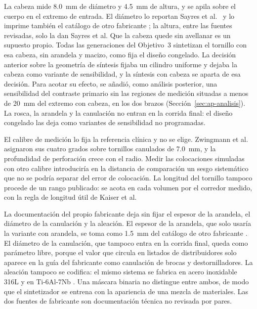 La cabeza mide 8.0~mm de diámetro y 4.5~mm de altura, y se apila sobre el cuerpo en el extremo de entrada. El diámetro lo reportan Sayres et al.~\cite{sayres2014comparison} y lo imprime también el catálogo de otro fabricante \cite{doublemedical2021trauma}; la altura, entre las fuentes revisadas, solo la dan Sayres et al. Que la cabeza quede sin avellanar es un supuesto propio. Todas las generaciones del Objetivo~3 sintetizan el tornillo con esa cabeza, sin arandela y macizo, como fija el diseño congelado. La decisión anterior sobre la geometría de síntesis fijaba un cilindro uniforme y dejaba la cabeza como variante de sensibilidad, y la síntesis con cabeza se aparta de esa decisión. Para acotar su efecto, se añadió, como análisis posterior, una sensibilidad del contraste primario sin las regiones de medición situadas a menos de 20~mm del extremo con cabeza, en los dos brazos (Sección~\ref{sec:ap-analisis}). La rosca, la arandela y la canulación no entran en la corrida final: el diseño congelado las deja como variantes de sensibilidad no programadas.

El calibre de medición lo fija la referencia clínica y no se elige. Zwingmann et al.~\cite{zwingmann2009navigated} asignaron sus cuatro grados sobre tornillos canulados de 7.0~mm, y la profundidad de perforación crece con el radio. Medir las colocaciones simuladas con otro calibre introduciría en la distancia de comparación un sesgo sistemático que no se podría separar del error de colocación. La longitud del tornillo tampoco procede de un rango publicado: se acota en cada volumen por el corredor medido, con la regla de longitud útil de Kaiser et al.

La documentación del propio fabricante deja sin fijar el espesor de la arandela, el diámetro de la canulación y la aleación. El espesor de la arandela, que solo usaría la variante con arandela, se toma como 1.5~mm del catálogo de otro fabricante \cite{doublemedical2021trauma}. El diámetro de la canulación, que tampoco entra en la corrida final, queda como parámetro libre, porque el valor que circula en listados de distribuidores solo aparece en la guía del fabricante como canulación de brocas y destornilladores. La aleación tampoco se codifica: el mismo sistema se fabrica en acero inoxidable 316L y en Ti-6Al-7Nb \cite{synthes2003guide}. Una máscara binaria no distingue entre ambos, de modo que el sintetizador se entrena con la apariencia de una mezcla de materiales. Las dos fuentes de fabricante \cite{synthes2003guide,doublemedical2021trauma} son documentación técnica no revisada por pares.

